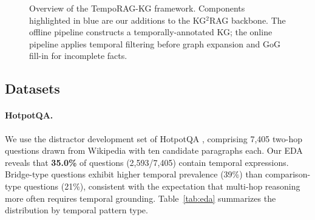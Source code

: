 \documentclass[11pt]{article}
\begin{document}
\begin{figure}[t]
  \centering
  \caption{Overview of the TempoRAG-KG framework. Components highlighted in
  blue are our additions to the KG$^2$RAG backbone. The offline pipeline
  constructs a temporally-annotated KG; the online pipeline applies temporal
  filtering before graph expansion and GoG fill-in for incomplete facts.}
  \label{fig:architecture}
\end{figure}

\subsection{Datasets}

\paragraph{HotpotQA.}
We use the distractor development set of HotpotQA \cite{yang2018hotpotqa},
comprising 7,405 two-hop questions drawn from Wikipedia with ten candidate
paragraphs each. Our EDA reveals that \textbf{35.0\%} of questions
(2,593/7,405) contain temporal expressions. Bridge-type questions exhibit
higher temporal prevalence (39\%) than comparison-type questions (21\%),
consistent with the expectation that multi-hop reasoning more often
requires temporal grounding. Table~\ref{tab:eda} summarizes the
distribution by temporal pattern type.
\end{document}
